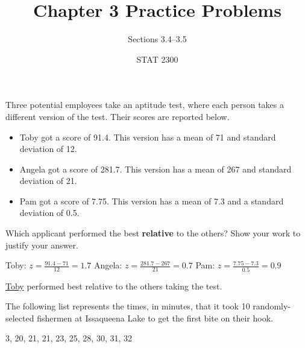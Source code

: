 \documentclass[noanswers]{exam}
\title{Chapter 3 Practice Problems}
\author{Sections 3.4--3.5}
\date{STAT 2300}
\begin{document}
%

\begin{questions} 
	
	\question Three potential employees take an aptitude test, where each person takes a different version of the test. Their scores are reported below.
	\begin{itemize}
		\item Toby got a score of 91.4. This version has a mean of 71 and standard deviation of 12.
		\item Angela got a score of 281.7. This version has a mean of 267 and standard deviation of 21.
		\item Pam got a score of 7.75. This version has a mean of 7.3 and a standard deviation of 0.5.
	
	\end{itemize}
	
	Which applicant performed the best \textbf{relative} to the others? Show your work to justify your answer. 
	
	\begin{solution}[\stretch{1}]
	
			\vspace{3mm}
			
			Toby: $z=\frac{91.4-71}{12}=1.7$ \hspace{12mm} Angela: $z=\frac{281.7-267}{21}=0.7$ \hspace{12mm} Pam: $z=\frac{7.75-7.3}{0.5}=0.9$
			
			\vspace{3mm}
		
			\underline{Toby} performed best relative to the others taking the test.			
			
			\vspace{3mm}
		\end{solution}
	
	\question The following list represents the times, in minutes, that it took 10 randomly-selected fishermen at Issaqueena Lake to get the first bite on their hook.
\begin{center}
    3, 20, 21, 21, 23, 25, 28, 30, 31, 32
\end{center}
	
	\vspace{3mm}
	
	\begin{parts}
	

\end{parts}
\end{questions}
\end{document}
